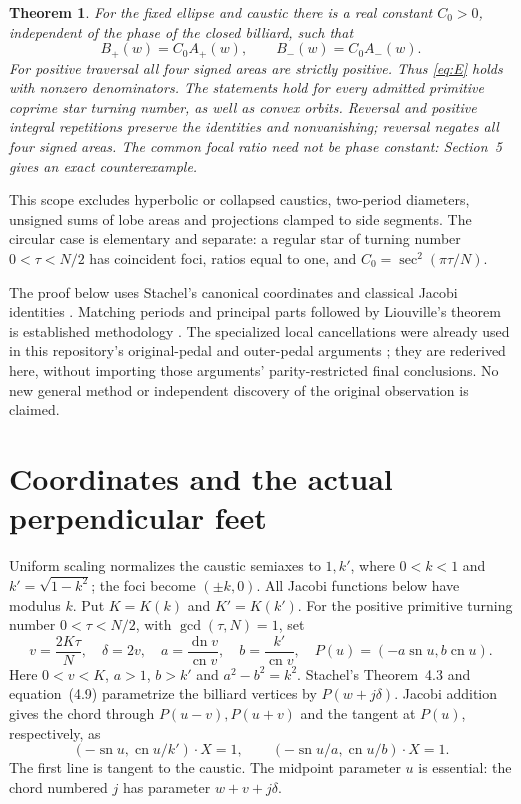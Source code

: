 \documentclass[11pt]{article}
\newtheorem{theorem}{Theorem}
\newcommand{\sn}{\operatorname{sn}}
\newcommand{\cn}{\operatorname{cn}}
\newcommand{\dn}{\operatorname{dn}}
\begin{document}
\begin{theorem}\label{thm:main}
For the fixed ellipse and caustic there is a real constant $C_0>0$,
independent of the phase of the closed billiard, such that
\begin{equation}\label{eq:M}
 B_+(w)=C_0A_+(w),\qquad B_-(w)=C_0A_-(w).
\end{equation}
For positive traversal all four signed areas are strictly positive.
Thus \eqref{eq:E} holds with nonzero denominators. The statements hold
for every admitted primitive coprime star turning number, as well as
convex orbits. Reversal and positive integral repetitions preserve
the identities and nonvanishing; reversal negates all four signed areas.
The common focal ratio need not be phase constant: Section~5 gives
an exact counterexample.
\end{theorem}

This scope excludes hyperbolic or collapsed caustics, two-period diameters,
unsigned sums of lobe areas and projections clamped to side segments.
The circular case is elementary and separate: a regular star of turning
number $0<\tau<N/2$ has coincident foci, ratios equal to one, and
$C_0=\sec^2(\pi\tau/N)$.

The proof below uses Stachel's canonical coordinates \cite{Stachel} and
classical Jacobi identities \cite{DLMF}. Matching periods and principal
parts followed by Liouville's theorem is established methodology
\cite{KLS,Roitman}. The specialized local cancellations were already used
in this repository's original-pedal and outer-pedal arguments
\cite{Campaign}; they are rederived here, without importing those
arguments' parity-restricted final conclusions. No new general method or
independent discovery of the original observation is claimed.

\section{Coordinates and the actual perpendicular feet}
Uniform scaling normalizes the caustic semiaxes to $1,k'$, where
$0<k<1$ and $k'=\sqrt{1-k^2}$; the foci become $(\pm k,0)$.
All Jacobi functions below have modulus $k$. Put
$K=K(k)$ and $K'=K(k')$. For the positive primitive turning number
$0<\tau<N/2$, with $\gcd(\tau,N)=1$, set
\begin{equation}\label{eq:canonical}
 v=\frac{2K\tau}{N},\quad \delta=2v,\quad
 a=\frac{\dn v}{\cn v},\quad b=\frac{k'}{\cn v},\quad
 P(u)=(-a\sn u,b\cn u).
\end{equation}
Here $0<v<K$, $a>1$, $b>k'$ and $a^2-b^2=k^2$.
Stachel's Theorem~4.3 and equation~(4.9) \cite{Stachel} parametrize
the billiard vertices by $P(w+j\delta)$.
Jacobi addition gives the chord through $P(u-v),P(u+v)$ and the
tangent at $P(u)$, respectively, as
\begin{equation}\label{eq:lines}
 (-\sn u,\cn u/k')\cdot X=1,\qquad
 (-\sn u/a,\cn u/b)\cdot X=1.
\end{equation}
The first line is tangent to the caustic. The midpoint parameter $u$
is essential: the chord numbered $j$ has parameter $w+v+j\delta$.
\end{document}
